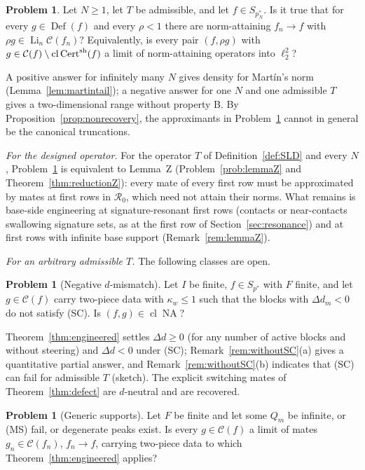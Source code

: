 \documentclass[10pt]{amsart}
\theoremstyle{definition}
\newtheorem{problem}[theorem]{Problem}
\theoremstyle{remark}
\newcommand{\NA}{\operatorname{NA}}
\newcommand{\Cset}{\mathcal C}
\newcommand{\Cert}{\operatorname{Cert}}
\newcommand{\Li}{\operatorname*{Li}}
\newcommand{\cl}{\operatorname{cl}}
\newcommand{\Def}{\operatorname{Def}}
\begin{document}
\begin{problem}\label{prob:main}
Let $N\ge1$, let $T$ be admissible, and let $f\in S_{p_N^*}$.  Is it true
that for every $g\in\Def(f)$ and every $\rho<1$ there are norm-attaining
$f_n\to f$ with $\rho g\in\Li_n\Cset(f_n)$?  Equivalently, is every pair
$(f,\rho g)$ with $g\in\Cset(f)\setminus\cl\Cert^{\rm sh}(f)$ a limit of
norm-attaining operators into $\ell_2^2$?
\end{problem}

A positive answer for infinitely many $N$ gives density for Mart\'in's
norm (Lemma~\ref{lem:martintail}); a negative answer for one $N$ and one
admissible $T$ gives a two-dimensional range without property B.  By
Proposition~\ref{prop:nonrecovery}, the approximants in
Problem~\ref{prob:main} cannot in general be the canonical truncations.

\emph{For the designed operator.}  For the operator $T$ of
Definition~\ref{def:SLD} and every $N$, Problem~\ref{prob:main} is
equivalent to Lemma~Z (Problem~\ref{prob:lemmaZ} and
Theorem~\ref{thm:reductionZ}): every mate of every first row must be
approximated by mates at first rows in $\mathcal R_0$, which need not attain
their norms.  What remains is base-side engineering at signature-resonant
first rows (contacts or near-contacts swallowing signature sets, as at the
first row of Section~\ref{sec:resonance}) and at first rows with infinite
base support (Remark~\ref{rem:lemmaZ}).

\emph{For an arbitrary admissible $T$.}  The following classes are open.

\begin{problem}[Negative $d$-mismatch]\label{prob:resonant}
Let $I$ be finite, $f\in S_{p^*}$ with $F$ finite, and let $g\in\Cset(f)$
carry two-piece data with $\kappa_w\le1$ such that the blocks with
$\Delta d_m<0$ do not satisfy \textup{(SC)}.  Is $(f,g)\in\cl\NA$?
\end{problem}

Theorem~\ref{thm:engineered} settles $\Delta d\ge0$ (for any number of
active blocks and without steering) and $\Delta d<0$ under \textup{(SC)};
Remark~\ref{rem:withoutSC}(a) gives a quantitative partial answer, and
Remark~\ref{rem:withoutSC}(b) indicates that \textup{(SC)} can fail for
admissible $T$ (sketch).  The explicit switching mates of
Theorem~\ref{thm:defect} are $d$-neutral and are recovered.

\begin{problem}[Generic supports]\label{prob:generic}
Let $F$ be finite and let some $Q_m$ be infinite, or \textup{(MS)} fail, or
degenerate peaks exist.  Is every $g\in\Cset(f)$ a limit of mates
$g_n\in\Cset(f_n)$, $f_n\to f$, carrying two-piece data to which
Theorem~\ref{thm:engineered} applies?
\end{problem}
\end{document}
